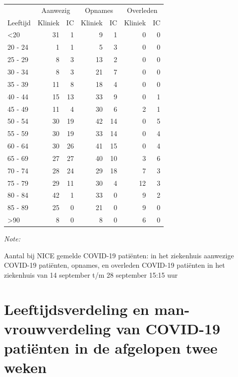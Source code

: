 \documentclass[
  english,
  man,floatsintext]{apa6}
\begin{document}
\begin{table}
\centering\begingroup\fontsize{10}{12}\selectfont

\begin{threeparttable}
\begin{tabular}{lrrrrrr}
\toprule
\multicolumn{1}{c}{ } & \multicolumn{2}{c}{Aanwezig} & \multicolumn{2}{c}{Opnames} & \multicolumn{2}{c}{Overleden} \\
\cmidrule(l{3pt}r{3pt}){2-3} \cmidrule(l{3pt}r{3pt}){4-5} \cmidrule(l{3pt}r{3pt}){6-7}
Leeftijd & Kliniek & IC & Kliniek & IC & Kliniek & IC\\
\midrule
<20 & 31 & 1 & 9 & 1 & 0 & 0\\
20 - 24 & 1 & 1 & 5 & 3 & 0 & 0\\
25 - 29 & 8 & 3 & 13 & 2 & 0 & 0\\
30 - 34 & 8 & 3 & 21 & 7 & 0 & 0\\
35 - 39 & 11 & 8 & 18 & 4 & 0 & 0\\
40 - 44 & 15 & 13 & 33 & 9 & 0 & 1\\
45 - 49 & 11 & 4 & 30 & 6 & 2 & 1\\
50 - 54 & 30 & 19 & 42 & 14 & 0 & 5\\
55 - 59 & 30 & 19 & 33 & 14 & 0 & 4\\
60 - 64 & 30 & 26 & 41 & 15 & 0 & 4\\
65 - 69 & 27 & 27 & 40 & 10 & 3 & 6\\
70 - 74 & 28 & 24 & 29 & 18 & 7 & 3\\
75 - 79 & 29 & 11 & 30 & 4 & 12 & 3\\
80 - 84 & 42 & 1 & 33 & 0 & 9 & 2\\
85 - 89 & 25 & 0 & 21 & 0 & 9 & 0\\
>90 & 8 & 0 & 8 & 0 & 6 & 0\\
\bottomrule
\end{tabular}
\begin{tablenotes}
\item \textit{Note: } 
\item Aantal bij NICE gemelde COVID-19 patiënten: in het ziekenhuis aanwezige COVID-19 patiënten, opnames, en overleden COVID-19 patiënten in het ziekenhuis van 14 september t/m 28 september 15:15 uur
\end{tablenotes}
\end{threeparttable}
\endgroup{}
\end{table}

\newpage

\hypertarget{leeftijdsverdeling-en-man-vrouwverdeling-van-covid-19-patiuxebnten-in-de-afgelopen-twee-weken}{%
\section{Leeftijdsverdeling en man-vrouwverdeling van COVID-19 patiënten in de afgelopen twee weken}\label{leeftijdsverdeling-en-man-vrouwverdeling-van-covid-19-patiuxebnten-in-de-afgelopen-twee-weken}}
\end{document}
